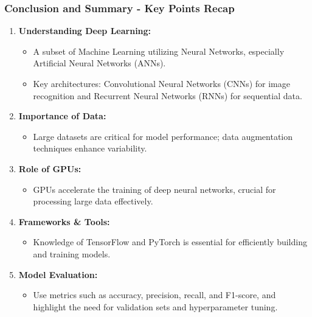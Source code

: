 \documentclass[aspectratio=169]{beamer}
\begin{document}
\begin{frame}[fragile]
    \frametitle{Conclusion and Summary - Key Points Recap}
    \begin{enumerate}
        \item \textbf{Understanding Deep Learning:}
        \begin{itemize}
            \item A subset of Machine Learning utilizing Neural Networks, especially Artificial Neural Networks (ANNs).
            \item Key architectures: Convolutional Neural Networks (CNNs) for image recognition and Recurrent Neural Networks (RNNs) for sequential data.
        \end{itemize}
        
        \item \textbf{Importance of Data:}
        \begin{itemize}
            \item Large datasets are critical for model performance; data augmentation techniques enhance variability.
        \end{itemize}
        
        \item \textbf{Role of GPUs:}
        \begin{itemize}
            \item GPUs accelerate the training of deep neural networks, crucial for processing large data effectively.
        \end{itemize}
        
        \item \textbf{Frameworks \& Tools:}
        \begin{itemize}
            \item Knowledge of TensorFlow and PyTorch is essential for efficiently building and training models.
        \end{itemize}
        
        \item \textbf{Model Evaluation:}
        \begin{itemize}
            \item Use metrics such as accuracy, precision, recall, and F1-score, and highlight the need for validation sets and hyperparameter tuning.
        \end{itemize}
    \end{enumerate}
\end{frame}
\end{document}
